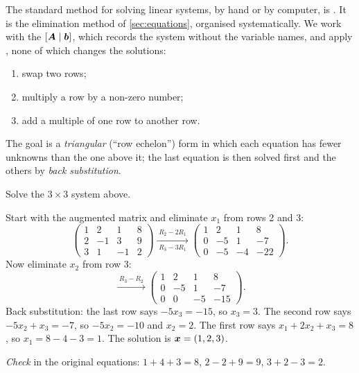 The standard method for solving linear systems, by hand or by computer, is
. It is the elimination method of
\cref{sec:equations}, organised systematically. We work with the
 $[\bm{A} \mid \bm{b}]$, which records the system without the
variable names, and apply , none of which changes the solutions:
\begin{enumerate}[label=(\roman*)]
  \item swap two rows;
  \item multiply a row by a non-zero number;
  \item add a multiple of one row to another row.
\end{enumerate}
The goal is a \emph{triangular} (``row echelon'') form in which each equation
has fewer unknowns than the one above it; the last equation is then solved
first and the others by \emph{back substitution}.

\begin{example}\label{ex:gaussian-elimination}
Solve the $3\times3$ system above.

\sol Start with the augmented matrix and eliminate $x_1$ from rows 2 and 3:
\[
  \left(\begin{array}{rrr|r} 1 & 2 & 1 & 8\\ 2 & -1 & 3 & 9\\ 3 & 1 & -1 & 2
  \end{array}\right)
  \xrightarrow[\;R_3 - 3R_1\;]{\;R_2 - 2R_1\;}
  \left(\begin{array}{rrr|r} 1 & 2 & 1 & 8\\ 0 & -5 & 1 & -7\\ 0 & -5 & -4 & -22
  \end{array}\right).
\]
Now eliminate $x_2$ from row 3:
\[
  \xrightarrow{\;R_3 - R_2\;}
  \left(\begin{array}{rrr|r} 1 & 2 & 1 & 8\\ 0 & -5 & 1 & -7\\ 0 & 0 & -5 & -15
  \end{array}\right).
\]
Back substitution: the last row says $-5x_3 = -15$, so $x_3 = 3$. The second
row says $-5x_2 + x_3 = -7$, so $-5x_2 = -10$ and $x_2 = 2$. The first row says
$x_1 + 2x_2 + x_3 = 8$, so $x_1 = 8 - 4 - 3 = 1$. The solution is
$\bm{x} = (1, 2, 3)$.

\emph{Check} in the original equations: $1 + 4 + 3 = 8$, $2 - 2 + 9 = 9$,
$3 + 2 - 3 = 2$. \checkmark
\end{example}

